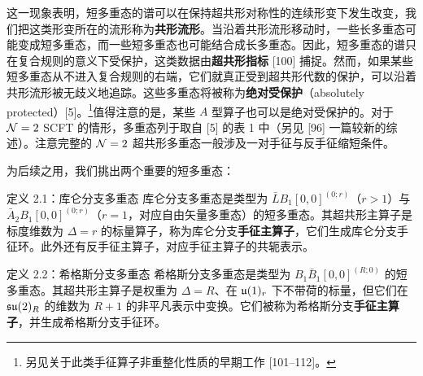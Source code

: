 
这一现象表明，短多重态的谱可以在保持超共形对称性的连续形变下发生改变，我们把这类形变所在的流形称为\textbf{共形流形}。当沿着共形流形移动时，一些长多重态可能变成短多重态，而一些短多重态也可能结合成长多重态。因此，短多重态的谱只在复合规则的意义下受保护，这类数据由\textbf{超共形指标} [100] 捕捉。然而，如果某些短多重态从不进入复合规则的右端，它们就真正受到超共形代数的保护，可以沿着共形流形被无歧义地追踪。这些多重态将被称为\textbf{绝对受保护}（absolutely protected）[5]。\footnote{另见关于此类手征算子非重整化性质的早期工作 [101--112]。}值得注意的是，某些 $A$ 型算子也可以是绝对受保护的。对于 $\mathcal{N}=2$ SCFT 的情形，多重态列于取自 [5] 的表 1 中（另见 [96] 一篇较新的综述）。注意完整的 $\mathcal{N}=2$ 超共形多重态一般涉及一对手征与反手征缩短条件。

为后续之用，我们挑出两个重要的短多重态：

\begin{definitionbox}{定义 2.1：库仑分支多重态}
库仑分支多重态是类型为 $\bar LB_1[0,0]^{(0;r)}$（$r>1$）与 $\bar A_2B_1[0,0]^{(0;r)}$（$r=1$，对应自由矢量多重态）的短多重态。其超共形主算子是标度维数为 $\Delta=r$ 的标量算子，称为库仑分支\textbf{手征主算子}，它们生成库仑分支手征环。此外还有反手征主算子，对应手征主算子的共轭表示。
\end{definitionbox}

\begin{definitionbox}{定义 2.2：希格斯分支多重态}
希格斯分支多重态是类型为 $B_1\bar B_1[0,0]^{(R;0)}$ 的短多重态。其超共形主算子是权重为 $\Delta=R$、在 $\mathfrak{u}(1)_r$ 下不带荷的标量，但它们在 $\mathfrak{su}(2)_R$ 的维数为 $R+1$ 的非平凡表示中变换。它们被称为希格斯分支\textbf{手征主算子}，并生成希格斯分支手征环。
\end{definitionbox}

